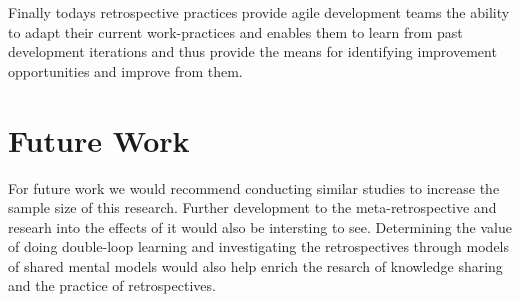 Finally todays retrospective practices provide agile development teams the ability to adapt their current work-practices and enables them to learn from past development iterations and thus provide the means for identifying improvement opportunities and improve from them. 

\section{Future Work}
For future work we would recommend conducting similar studies to increase the sample size of this research. Further development to the meta-retrospective and researh into the effects of it would also be intersting to see. Determining the value of doing double-loop learning and investigating the retrospectives through models of shared mental models would also help enrich the resarch of knowledge sharing and the practice of retrospectives. 
